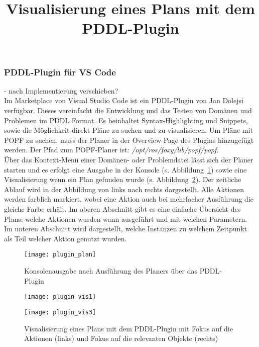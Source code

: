 \subsubsection{PDDL-Plugin für VS Code}
- nach Implementierung verschieben?\\
Im Marketplace von Visual Studio Code ist ein PDDL-Plugin von Jan Dolejsi verfügbar.
Dieses vereinfacht die Entwicklung und das Testen von Domänen und Problemen im PDDL Format.
Es beinhaltet Syntax-Highlighting und Snippets, sowie die Möglichkeit direkt Pläne zu suchen und zu visualisieren.
Um Pläne mit \ac{POPF} zu suchen, muss der Planer in der Overview-Page des Plugins hinzugefügt werden.
Der Pfad zum \ac{POPF}-Planer ist: \emph{/opt/ros/foxy/lib/popf/popf}.\\
Über das Kontext-Menü einer Domänen- oder Problemdatei lässt sich der Planer starten und es erfolgt eine Ausgabe in der Konsole (s. Abbildung~\ref{fig:pluginplan}) sowie eine Visualisierung wenn ein Plan gefunden wurde (s. Abbildung~\ref{fig:pluginvis}).
Der zeitliche Ablauf wird in der Abbildung von links nach rechts dargestellt.
Alle Aktionen werden farblich markiert, wobei eine Aktion auch bei mehrfacher Ausführung die gleiche Farbe erhält.
Im oberen Abschnitt gibt es eine einfache Übersicht des Plans: welche Aktionen wurden wann ausgeführt und mit welchen Parametern.
Im unteren Abschnitt wird dargestellt, welche Instanzen zu welchem Zeitpunkt als Teil welcher Aktion genutzt wurden.
\begin{figure}[ht!]
    \centering
    \texttt{[image: plugin\_plan]}
    \caption{Konsolenausgabe nach Ausführung des Planers über das PDDL-Plugin}
    \label{fig:pluginplan}
\end{figure}

\begin{figure}[ht!]
    \centering
    \begin{minipage}[t]{0.45\linewidth}
        \centering
        \texttt{[image: plugin\_vis1]}
    \end{minipage}%
    \hfill
    \begin{minipage}[t]{0.45\linewidth}
        \centering
        \texttt{[image: plugin\_vis3]}
    \end{minipage}
    \title{Visualisierung eines Plans mit dem PDDL-Plugin}
    \caption{Visualisierung eines Plans mit dem PDDL-Plugin mit Fokus auf die Aktionen (links) und Fokus auf die relevanten Objekte (rechts)}
    \label{fig:pluginvis}
\end{figure}
